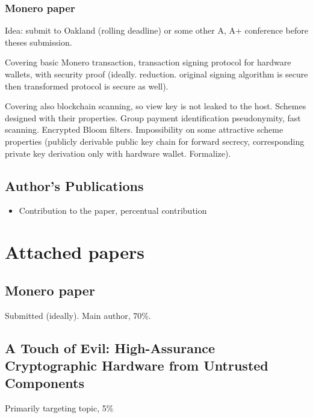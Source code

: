 \documentclass[
  digital, %
  twoside, %
  table,   %
  lof,     %
  lot,     %
]{fithesis3}
\begin{document}
\begin{ecmmnt}
\subsection{Monero paper}

Idea: submit to Oakland (rolling deadline) or some other A, A+ conference before theses submission. 

Covering basic Monero transaction, transaction signing protocol for hardware wallets, with security proof (ideally. reduction. original signing algorithm is secure then transformed protocol is secure as well).

Covering also blockchain scanning, so view key is not leaked to the host. Schemes designed with their properties. Group payment identification pseudonymity, fast scanning. Encrypted Bloom filters. Impossibility on some attractive scheme properties (publicly derivable public key chain for forward secrecy, corresponding private key derivation only with hardware wallet. Formalize). 


\section{Author's Publications}
\begin{shaded}
\begin{itemize}
    \item Contribution to the paper, percentual contribution
\end{itemize}
\end{shaded}


  \printbibliography[heading=bibintoc] 




\appendix 
\chapter{Attached papers}

\section{Monero paper}
Submitted (ideally). Main author, 70\%.

\section{A Touch of Evil: High-Assurance Cryptographic Hardware from Untrusted Components}
Primarily targeting topic, 5\% \cite{2017-ccs-mavroudis}


\end{ecmmnt}
\end{document}
